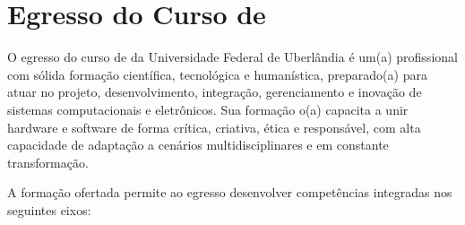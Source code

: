 \section{Egresso do Curso de \nomecursonovo}

O egresso do curso de \nomecursonovo da Universidade Federal de Uberlândia é um(a) profissional com sólida formação científica, tecnológica e humanística, preparado(a) para atuar no projeto, desenvolvimento, integração, gerenciamento e inovação de sistemas computacionais e eletrônicos. Sua formação o(a) capacita a unir hardware e software de forma crítica, criativa, ética e responsável, com alta capacidade de adaptação a cenários multidisciplinares e em constante transformação.

A formação ofertada permite ao egresso desenvolver competências integradas nos seguintes eixos:

